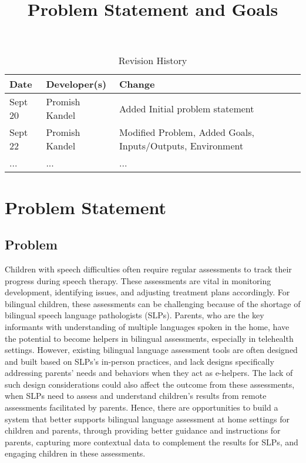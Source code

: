 \documentclass{article}
\title{Problem Statement and Goals\\\progname}
\author{\authname}
\date{}
\begin{document}
\maketitle

\begin{table}[hp]
\caption{Revision History} \label{TblRevisionHistory}
\begin{tabularx}{\textwidth}{llX}
\toprule
\textbf{Date} & \textbf{Developer(s)} & \textbf{Change}\\
\midrule
Sept 20 & Promish Kandel& Added Initial problem statement\\
Sept 22 & Promish Kandel & Modified Problem, Added Goals, Inputs/Outputs, Environment\\
... & ... & ...\\
\bottomrule
\end{tabularx}
\end{table}

\section{Problem Statement}


\subsection{Problem}
\hspace{2em}Children with speech difficulties often require regular assessments to track their progress during speech therapy. These assessments are vital in monitoring development, identifying issues, and adjusting treatment plans accordingly. For bilingual children, these assessments can be challenging because of the shortage of bilingual  speech language pathologists (SLPs).  Parents, who are the key informants with understanding of multiple languages spoken in the home, have the potential to become helpers in bilingual assessments, especially in telehealth settings. However, existing bilingual language assessment tools are often designed and built based on SLPs’s in-person practices, and lack designs specifically addressing parents’ needs and behaviors when they act as e-helpers. The lack of such design considerations could also affect the outcome from these assessments, when SLPs need to assess and understand children’s results from remote assessments facilitated by parents. Hence, there are opportunities to build a system that better supports bilingual language assessment at home settings for children and parents, through providing better guidance and instructions for parents, capturing more contextual data to complement the results for SLPs, and engaging children in these assessments. 
\end{document}
